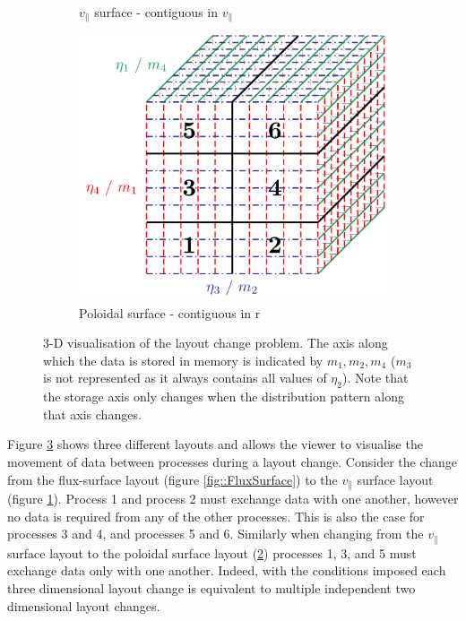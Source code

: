 \begin{figure}[ht]
\begin{center}
\begin{subfigure}[t]{.45\textwidth}
  \caption{\label{fig::VPar}$v_\parallel$ surface - contiguous in $v_\parallel$}
 \end{subfigure}
 \begin{subfigure}[t]{.45\textwidth}
  \vspace{1em}
  \includegraphics[width=\textwidth]{Figs/ParallelDivision/PoloidalSurface}
  \caption{\label{fig::Poloidal}Poloidal surface - contiguous in r}
 \end{subfigure}
  \caption{\label{fig::Cartesian} 3-D visualisation of the layout change problem. The axis along which the data is stored in memory is indicated by $m_1,m_2,m_4$ ($m_3$ is not represented as it always contains all values of $\eta_2$). Note that the storage axis only changes when the distribution pattern along that axis changes.}
 \end{center}
\end{figure}

Figure \ref{fig::Cartesian} shows three different layouts and allows the viewer to visualise the movement of data between processes during a layout change. Consider the change from the flux-surface layout (figure \ref{fig::FluxSurface}) to the $v_\parallel$ surface layout (figure \ref{fig::VPar}). Process 1 and process 2 must exchange data with one another, however no data is required from any of the other processes. This is also the case for processes 3 and 4, and processes 5 and 6. Similarly when changing from the $v_\parallel$ surface layout to the poloidal surface layout (\ref{fig::Poloidal}) processes 1, 3, and 5 must exchange data only with one another. Indeed, with the conditions imposed each three dimensional layout change is equivalent to multiple independent two dimensional layout changes.

